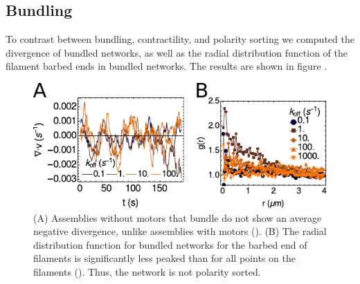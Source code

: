 \documentclass[12pt]{article}
\begin{document}
\subsection{Bundling}
To contrast between bundling, contractility, and polarity sorting
we computed the divergence of bundled networks, as well as the
radial distribution function of the filament barbed ends in bundled
networks. The results are shown in figure . 
\begin{figure}[H] 
  \centering
  \includegraphics[width=\textwidth]{figs/bundling/bundling_supplement.pdf}
  \caption{\label{fig:bundling_supp}
  (A) Assemblies without motors that bundle do not show an average negative divergence, unlike assemblies with motors ().
  (B) The radial distribution function for bundled networks for the barbed end of filaments is significantly less peaked than for all points on the filaments (). Thus, the network is not polarity sorted. 
  }
\end{figure}
\end{document}
